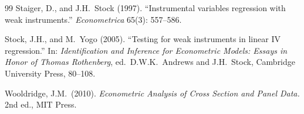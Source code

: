 \documentclass[11pt,a4paper]{article}
\begin{document}
\begin{thebibliography}{99}
Staiger, D., and J.H.\ Stock (1997). ``Instrumental variables
  regression with weak instruments.'' \emph{Econometrica} 65(3):
  557--586.

Stock, J.H., and M.\ Yogo (2005). ``Testing for weak instruments in
  linear IV regression.'' In: \emph{Identification and Inference for
  Econometric Models: Essays in Honor of Thomas Rothenberg}, ed.\
  D.W.K.\ Andrews and J.H.\ Stock, Cambridge University Press,
  80--108.

Wooldridge, J.M.\ (2010). \emph{Econometric Analysis of Cross
  Section and Panel Data.} 2nd ed., MIT Press.

\end{thebibliography}
\end{document}

